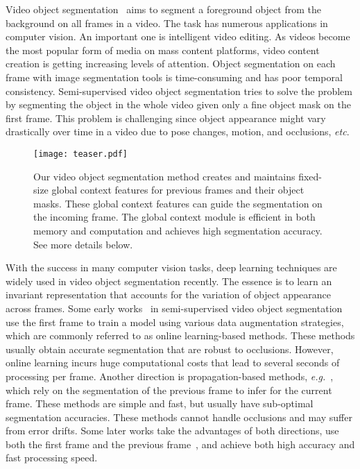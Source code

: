 \documentclass[runningheads]{llncs}
\begin{document}
Video object segmentation~\cite{snapcut,cut-and-paste,live-cut,interact-cutout} aims to segment a foreground object from the background on all frames in a video. The task has numerous applications in computer vision. An important one is intelligent video editing. As videos become the most popular form of media on mass content platforms, video content creation is getting increasing levels of attention. Object segmentation on each frame with image segmentation tools is time-consuming and has poor temporal consistency. Semi-supervised video object segmentation tries to solve the problem by segmenting the object in the whole video given only a fine object mask on the first frame. This problem is challenging since object appearance might vary drastically over time in a video due to pose changes, motion, and occlusions, \textit{etc}.

\begin{figure}
    \texttt{[image: teaser.pdf]}
    \caption{Our video object segmentation method creates and maintains fixed-size global context features for previous frames and their object masks. These global context features can guide the segmentation on the incoming frame. The global context module is efficient in both memory and computation and achieves high segmentation accuracy. See more details below.}
    \label{fig:teaser}
\end{figure}

With the success in many computer vision tasks, deep learning techniques are widely used in video object segmentation recently. The essence is to learn an invariant representation that accounts for the variation of object appearance across frames. Some early works~\cite{osvos,osvoss,masktrack,onavos} in semi-supervised video object segmentation use the first frame to train a model using various data augmentation strategies, which are commonly referred to as online learning-based methods. These methods usually obtain accurate segmentation that are robust to occlusions. However, online learning incurs huge computational costs that lead to several seconds of processing per frame. Another direction is propagation-based methods, \textit{e.g.}~\cite{fvos}, which rely on the segmentation of the previous frame to infer for the current frame. These methods are simple and fast, but usually have sub-optimal segmentation accuracies. These methods cannot handle occlusions and may suffer from error drifts. Some later works take the advantages of both directions, use both the first frame and the previous frame~\cite{feelvos,ranet,rgmp,osmn}, and achieve both high accuracy and fast processing speed.
\end{document}
